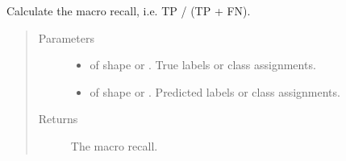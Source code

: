 \documentclass[letterpaper,10pt,english]{sphinxmanual}
\begin{document}
\begin{fulllineitems}
\label{\detokenize{pusion.evaluation.evaluation_metrics:pusion.evaluation.evaluation_metrics.macro_recall}}
\sphinxAtStartPar
Calculate the macro recall, i.e.  TP / (TP + FN).
\begin{quote}\begin{description}
\item[{Parameters}] \leavevmode\begin{itemize}
\item {} 
\sphinxAtStartPar
{} \textendash{}  of shape  or . True labels or class assignments.

\item {} 
\sphinxAtStartPar
{} \textendash{}  of shape  or . Predicted labels or
class assignments.

\end{itemize}

\item[{Returns}] \leavevmode
\sphinxAtStartPar
The macro recall.

\end{description}\end{quote}

\end{fulllineitems}

\end{document}
